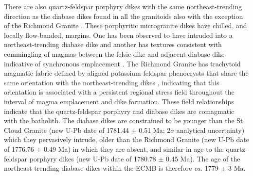 \documentclass[draft]{agujournal2019}
\begin{document}
There are also quartz-feldspar porphyry dikes with the same northeast-trending direction as the diabase dikes found in all the granitoids also with the exception of the Richmond Granite \cite{Boerboom2005b}. These porphyritic microgranite dikes have chilled, and locally flow-banded, margins. One has been observed to have intruded into a northeast-trending diabase dike and another has textures consistent with commingling of magmas between the felsic dike and adjacent diabase dike indicative of synchronous emplacement \cite{Boerboom2000a}. The Richmond Granite has trachytoid magmatic fabric defined by aligned potassium-feldspar phenocrysts that share the same orientation with the northeast-trending dikes \cite{Boerboom2000a}, indicating that this orientation is associated with a persistent regional stress field throughout the interval of magma emplacement and dike formation. These field relationships indicate that the quartz-feldspar porphyry and diabase dikes are comagmatic with the batholith. The diabase dikes are constrained to be younger than the St. Cloud Granite (new U-Pb date of 1781.44 $\pm$ 0.51 Ma; 2$\sigma$ analytical uncertainty) which they pervasively intrude, older than the Richmond Granite (new U-Pb date of 1776.76 $\pm$ 0.49 Ma) in which they are absent, and similar in age to the quartz-feldspar porphyry dikes (new U-Pb date of 1780.78 $\pm$ 0.45 Ma). The age of the northeast-trending diabase dikes within the ECMB is therefore \textit{ca.} 1779 $\pm$ 3 Ma.
\end{document}
